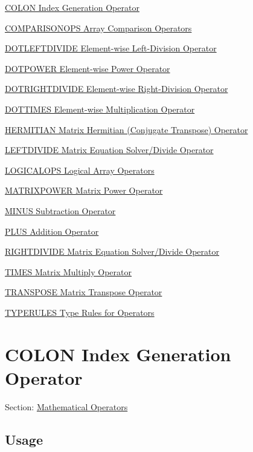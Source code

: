 
\begin{DoxyItemize}
\item \hyperlink{operators_colon}{C\-O\-L\-O\-N Index Generation Operator}  
\item \hyperlink{operators_comparisonops}{C\-O\-M\-P\-A\-R\-I\-S\-O\-N\-O\-P\-S Array Comparison Operators}  
\item \hyperlink{operators_dotleftdivide}{D\-O\-T\-L\-E\-F\-T\-D\-I\-V\-I\-D\-E Element-\/wise Left-\/\-Division Operator}  
\item \hyperlink{operators_dotpower}{D\-O\-T\-P\-O\-W\-E\-R Element-\/wise Power Operator}  
\item \hyperlink{operators_dotrightdivide}{D\-O\-T\-R\-I\-G\-H\-T\-D\-I\-V\-I\-D\-E Element-\/wise Right-\/\-Division Operator}  
\item \hyperlink{operators_dottimes}{D\-O\-T\-T\-I\-M\-E\-S Element-\/wise Multiplication Operator}  
\item \hyperlink{operators_hermitian}{H\-E\-R\-M\-I\-T\-I\-A\-N Matrix Hermitian (Conjugate Transpose) Operator}  
\item \hyperlink{operators_leftdivide}{L\-E\-F\-T\-D\-I\-V\-I\-D\-E Matrix Equation Solver/\-Divide Operator}  
\item \hyperlink{operators_logicalops}{L\-O\-G\-I\-C\-A\-L\-O\-P\-S Logical Array Operators}  
\item \hyperlink{operators_matrixpower}{M\-A\-T\-R\-I\-X\-P\-O\-W\-E\-R Matrix Power Operator}  
\item \hyperlink{operators_minus}{M\-I\-N\-U\-S Subtraction Operator}  
\item \hyperlink{operators_plus}{P\-L\-U\-S Addition Operator}  
\item \hyperlink{operators_rightdivide}{R\-I\-G\-H\-T\-D\-I\-V\-I\-D\-E Matrix Equation Solver/\-Divide Operator}  
\item \hyperlink{operators_times}{T\-I\-M\-E\-S Matrix Multiply Operator}  
\item \hyperlink{operators_transpose}{T\-R\-A\-N\-S\-P\-O\-S\-E Matrix Transpose Operator}  
\item \hyperlink{operators_typerules}{T\-Y\-P\-E\-R\-U\-L\-E\-S Type Rules for Operators}  
\end{DoxyItemize}\hypertarget{operators_colon}{}\section{C\-O\-L\-O\-N Index Generation Operator}\label{operators_colon}
Section\-: \hyperlink{sec_operators}{Mathematical Operators} \hypertarget{vtkwidgets_vtkxyplotwidget_Usage}{}\subsection{Usage}\label{vtkwidgets_vtkxyplotwidget_Usage}
